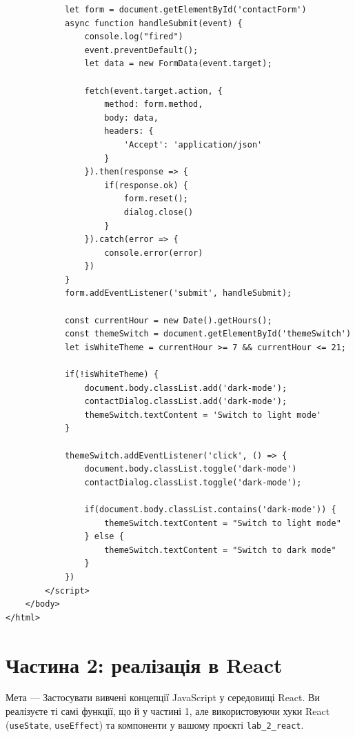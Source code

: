 \documentclass[12pt, a4paper]{article}
\begin{document}
\begin{lstlisting}
			let form = document.getElementById('contactForm')
			async function handleSubmit(event) {
				console.log("fired")
				event.preventDefault();
				let data = new FormData(event.target);

				fetch(event.target.action, {
					method: form.method,
					body: data,
					headers: {
						'Accept': 'application/json'
					}
				}).then(response => {
					if(response.ok) {
						form.reset();
						dialog.close()
					}
				}).catch(error => {
					console.error(error)
				})
			}
			form.addEventListener('submit', handleSubmit);

			const currentHour = new Date().getHours();
			const themeSwitch = document.getElementById('themeSwitch')
			let isWhiteTheme = currentHour >= 7 && currentHour <= 21;

			if(!isWhiteTheme) {
				document.body.classList.add('dark-mode');
				contactDialog.classList.add('dark-mode');
				themeSwitch.textContent = 'Switch to light mode'
			}

			themeSwitch.addEventListener('click', () => {
				document.body.classList.toggle('dark-mode')
				contactDialog.classList.toggle('dark-mode');

				if(document.body.classList.contains('dark-mode')) {
					themeSwitch.textContent = "Switch to light mode"
				} else {
					themeSwitch.textContent = "Switch to dark mode"
				}
			})
		</script>
	</body>
</html>
\end{lstlisting}
\section{Частина 2: реалізація в React}
Мета --- Застосувати вивчені концепції JavaScript у середовищі React. Ви реалізуєте ті самі функції, що й у частині 1, але використовуючи хуки React (\verb|useState|, \verb|useEffect|) та компоненти у вашому проєкті \verb|lab_2_react|. 
\end{document}
